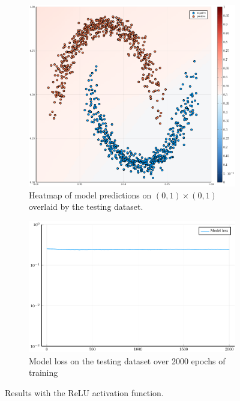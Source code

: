 \begin{figure}
	\centering
	\begin{subfigure}{0.49\textwidth}
		\centering
		\includegraphics[width=\textwidth]{images/relu-heatmap/relu.pdf}
		\caption{Heatmap of model predictions on \( \left( 0, 1 \right) \times \left( 0, 1 \right) \) overlaid by the testing dataset.}
	\end{subfigure}
	\begin{subfigure}{0.49\textwidth}
		\centering
		\includegraphics[width=\textwidth]{images/relu-modelloss/relu.pdf}
		\caption{Model loss on the testing dataset over 2000 epochs of training}
	\end{subfigure}
	\caption{Results with the ReLU activation function.}\label{relu}
\end{figure}

